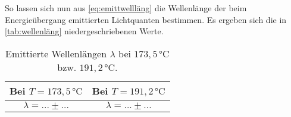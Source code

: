 So lassen sich nun aus \eqref{eq:emittwellläng} die Wellenlänge der beim Energieübergang emittierten Lichtquanten bestimmen.
Es ergeben sich die in \autoref{tab:wellenläng} niedergeschriebenen Werte.

\begin{table}[H]
    \centering
    \caption{Emittierte Wellenlängen $\lambda$ bei $173,5 \,\unit{\celsius}$ bzw. $191,2 \,\unit{\celsius}$.}
    \label{tab:messung2}
    \begin{tabular}{S[table-format = 2.3] S[table-format = 2.3]}
      \toprule
      {Bei $T = 173,5 \,\unit{\celsius}$} & {Bei $T = 191,2 \,\unit{\celsius}$}\\
      \midrule
                  {$\lambda = ... \pm ...$}           &           {$\lambda = ... \pm ...$}           \\
      \bottomrule
    \end{tabular}
\end{table}